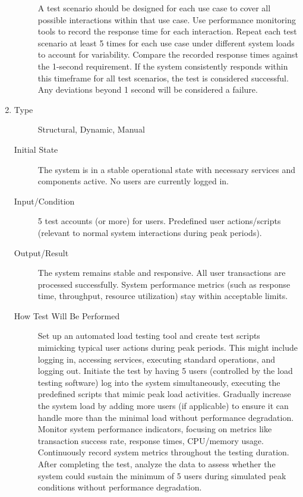 \documentclass[12pt, titlepage]{article}
\begin{document}
\begin{enumerate}[NFR-T1]
\begin{description}
    A test scenario should be designed for each use case to cover all possible
    interactions within that use case. Use performance monitoring tools to
    record the response time for each interaction. Repeat each test scenario at
    least 5 times for each use case under different system loads to account for
    variability. Compare the recorded response times against the 1-second
    requirement. If the system consistently responds within this timeframe for
    all test scenarios, the test is considered successful. Any deviations beyond
    1 second will be considered a failure.
  \end{description}
\item \label{NFRT3}
  \begin{description}
  \item[Type] Structural, Dynamic, Manual
  \item[Initial State] The system is in a stable operational state with necessary
    services and components active. No users are currently logged in.
  \item[Input/Condition] 5 test accounts (or more) for users. Predefined user
    actions/scripts (relevant to normal system interactions during peak
    periods).
  \item[Output/Result] The system remains stable and responsive. All user
    transactions are processed successfully. System performance metrics (such as
    response time, throughput, resource utilization) stay within acceptable
    limits.
  \item[How Test Will Be Performed] Set up an automated load testing tool and
    create test scripts mimicking typical user actions during peak periods. This
    might include logging in, accessing services, executing standard operations,
    and logging out. Initiate the test by having 5 users (controlled by the load
    testing software) log into the system simultaneously, executing the
    predefined scripts that mimic peak load activities. Gradually increase the
    system load by adding more users (if applicable) to ensure it can handle
    more than the minimal load without performance degradation. Monitor system
    performance indicators, focusing on metrics like transaction success rate,
    response times, CPU/memory usage. Continuously record system metrics
    throughout the testing duration. After completing the test, analyze the data
    to assess whether the system could sustain the minimum of 5 users during
    simulated peak conditions without performance degradation.
  \end{description}

\end{enumerate}
\end{document}
